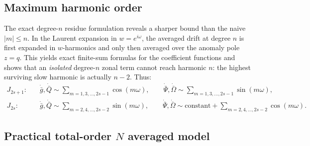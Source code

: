 \documentclass[11pt]{article}
\begin{document}
\subsection{Maximum harmonic order}

The exact degree-$n$ residue formulation reveals a sharper bound than the
naive $|m| \le n$. In the Laurent expansion in $w = e^{i\omega}$, the
averaged drift at degree $n$ is first expanded in $w$-harmonics and only
then averaged over the anomaly pole $z = q$. This yields exact finite-sum
formulas for the coefficient functions and shows that an \emph{isolated}
degree-$n$ zonal term cannot reach harmonic $n$: the highest surviving slow
harmonic is actually $n-2$. Thus:
\begin{equation}
\begin{aligned}
J_{2s+1}:&\quad
\dot{\bar g},\dot{\bar Q}
\sim \sum_{m=1,3,\dots,2s-1}\cos(m\omega),\qquad
\dot{\bar\Psi},\dot{\bar\Omega}
\sim \sum_{m=1,3,\dots,2s-1}\sin(m\omega),\\
J_{2s}:&\quad
\dot{\bar g},\dot{\bar Q}
\sim \sum_{m=2,4,\dots,2s-2}\sin(m\omega),\qquad
\dot{\bar\Psi},\dot{\bar\Omega}
\sim \text{constant}+\sum_{m=2,4,\dots,2s-2}\cos(m\omega).
\end{aligned}
\end{equation}

\subsection{Practical total-order \texorpdfstring{$N$}{N} averaged model}
\end{document}
